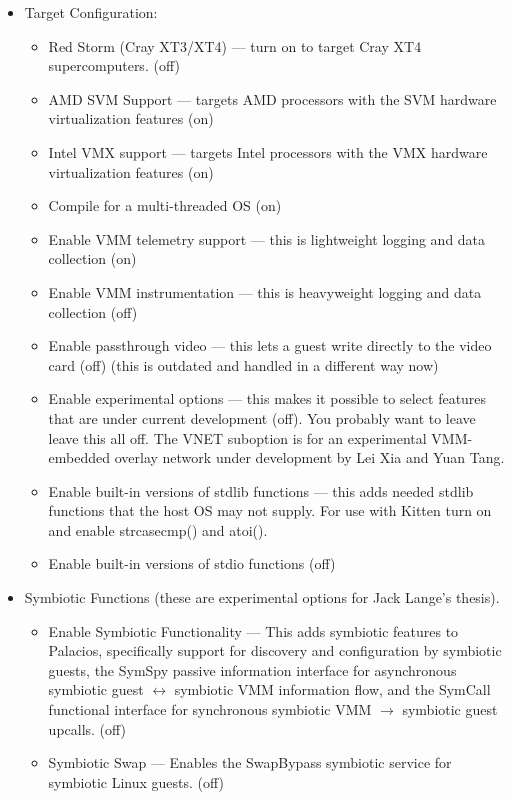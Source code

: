 \documentclass[11pt]{article}
\begin{document}
\begin{itemize}
\item Target Configuration:   
\begin{itemize}

\item Red Storm (Cray XT3/XT4) --- turn on to target Cray XT4
supercomputers.  (off)
\item AMD SVM Support --- targets AMD processors with the SVM hardware
virtualization features (on)
\item Intel VMX support --- targets Intel processors with the VMX
hardware virtualization features (on)
\item Compile for a multi-threaded OS (on)
\item Enable VMM telemetry support --- this is lightweight logging and
data collection (on)  
\item Enable VMM instrumentation --- this is heavyweight logging and
data collection (off)
\item Enable passthrough video --- this lets a guest write directly to
the video card (off)  (this is outdated and handled in a different way now)
\item Enable experimental options --- this makes it possible to select
features that are under current development (off).  You probably want
to leave leave this all off.  The VNET suboption is for an experimental VMM-embedded
overlay network under development by Lei Xia and Yuan Tang.
\item Enable built-in versions of stdlib functions --- this adds
needed stdlib functions that the host OS may not supply.  For use with
Kitten turn on and enable strcasecmp() and atoi().
\item Enable built-in versions of stdio functions (off)
\end{itemize}
\item Symbiotic Functions (these are experimental options for Jack
Lange's thesis). 
\begin{itemize}
\item Enable Symbiotic Functionality --- This adds symbiotic features
to Palacios, specifically support for discovery and configuration by
symbiotic guests, the SymSpy passive information interface for
asynchronous symbiotic guest $\leftrightarrow$ symbiotic VMM
information flow, and the SymCall functional interface for synchronous
symbiotic VMM $\rightarrow$ symbiotic guest upcalls.  (off)
\item Symbiotic Swap --- Enables the SwapBypass symbiotic service for
symbiotic Linux guests.  (off)

\end{itemize}
\end{itemize}
\end{document}
